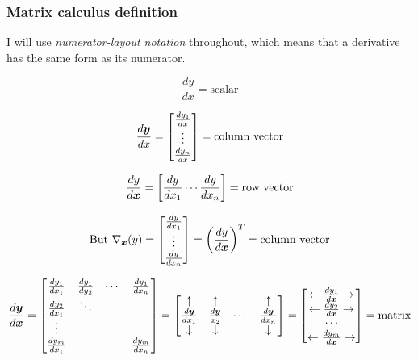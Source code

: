 \documentclass[../../main.tex]{subfiles}
\begin{document}
\subsubsection{Matrix calculus definition}

I will use \textit{numerator-layout notation} throughout, which means that a derivative has the same form as its numerator.

\[ \frac{dy}{dx} = \textrm{scalar}\]

\[ \frac{d\bm{y}}{dx} =
\left[\begin{matrix}
    \frac{dy_1}{dx} \\
    \vdots \\
    \frac{dy_n}{dx}
\end{matrix}\right] =
\textrm{column vector}
\]

\[ \frac{dy}{d\bm{x}} =
\left[
    \frac{dy}{dx_1} \cdots \frac{dy}{dx_n}
\right] =
\textrm{row vector}
\]

\[
\textrm{But  } \nabla_{\bm{x}}(y) =
\left[\begin{matrix}
    \frac{dy}{dx_1} \\
    \vdots \\
    \frac{dy}{dx_n}
\end{matrix}\right] =
{\left(\frac{dy}{d\bm{x}}\right)}^T =
\textrm{column vector}
\]

\[
\frac{d\bm{y}}{d\bm{x}} =
\left[\begin{matrix}
    \frac{dy_1}{dx_1} & \frac{dy_1}{dy_2} & \cdots & \frac{dy_1}{dx_n}\\
    \frac{dy_2}{dx_1} & \ddots & & \\
    \vdots & &  & \\
    \frac{dy_m}{dx_1} & & & \frac{dy_m}{dx_n}
\end{matrix}\right] =
\left[\begin{matrix}
        \uparrow & \uparrow & & \uparrow \\
        \frac{d\bm{y}}{dx_1} & \frac{d\bm{y}}{x_2} & \cdots & \frac{d\bm{y}}{dx_n} \\
        \downarrow & \downarrow & & \downarrow
\end{matrix}\right] =
\left[\begin{matrix}
        \leftarrow \frac{dy_1}{d\bm{x}} \rightarrow \\
        \leftarrow \frac{dy_2}{d\bm{x}} \rightarrow \\
        \cdots \\
        \leftarrow \frac{dy_m}{d\bm{x}} \rightarrow \\
\end{matrix}\right] =
\textrm{matrix}
\]
\end{document}
